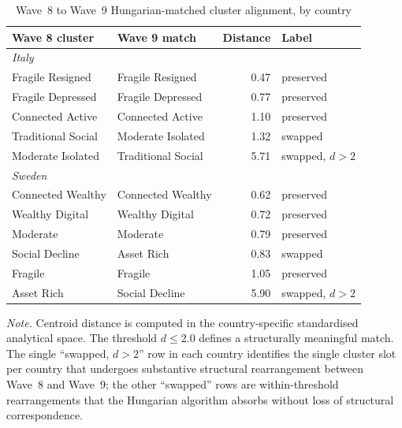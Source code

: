 \begin{table}[!htbp]
  \centering
  \small
  \caption[Wave~8 to Wave~9 cluster alignment]{Wave~8 to Wave~9 Hungarian-matched cluster alignment, by country}
  \label{tab:ch7-hungarian-w8w9}
  \renewcommand{\arraystretch}{1.15}
  \setlength{\tabcolsep}{6pt}
  \begin{tabular}{@{}llrl@{}}
    \toprule
    \textbf{Wave 8 cluster} & \textbf{Wave 9 match} & \textbf{Distance} & \textbf{Label} \\
    \midrule
    \multicolumn{4}{l}{\textit{Italy}} \\
    Fragile Resigned     & Fragile Resigned     & 0.47 & preserved \\
    Fragile Depressed    & Fragile Depressed    & 0.77 & preserved \\
    Connected Active     & Connected Active     & 1.10 & preserved \\
    Traditional Social   & Moderate Isolated    & 1.32 & swapped \\
    Moderate Isolated    & Traditional Social   & 5.71 & swapped, $d > 2$ \\
    \midrule
    \multicolumn{4}{l}{\textit{Sweden}} \\
    Connected Wealthy    & Connected Wealthy    & 0.62 & preserved \\
    Wealthy Digital      & Wealthy Digital      & 0.72 & preserved \\
    Moderate             & Moderate             & 0.79 & preserved \\
    Social Decline       & Asset Rich           & 0.83 & swapped \\
    Fragile              & Fragile              & 1.05 & preserved \\
    Asset Rich           & Social Decline       & 5.90 & swapped, $d > 2$ \\
    \bottomrule
  \end{tabular}
  \par\medskip
  \begin{minipage}{\linewidth}
    \footnotesize\textit{Note.} Centroid distance is computed in the country-specific standardised analytical space. The threshold $d \leq 2.0$ defines a structurally meaningful match. The single ``swapped, $d > 2$'' row in each country identifies the single cluster slot per country that undergoes substantive structural rearrangement between Wave~8 and Wave~9; the other ``swapped'' rows are within-threshold rearrangements that the Hungarian algorithm absorbs without loss of structural correspondence.
  \end{minipage}
\end{table}
\FloatBarrier

